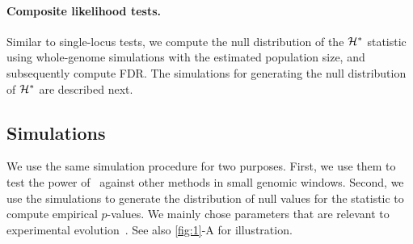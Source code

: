 \documentclass[9pt,twocolumn,twoside]{gsajnl}
\begin{document}
\paragraph{Composite likelihood tests.}

Similar to single-locus tests, we compute the null distribution of the
${\cal H}^*$ statistic using whole-genome simulations with the estimated
population size, and subsequently compute FDR. The simulations for
generating the null distribution of ${\cal H}^*$ are described next. 

\subsection{Simulations}\label{sec:sims}
We use the same simulation procedure for two purposes. First, we use
them to test the power of \comale\ against other methods in small
genomic windows. Second, we use the simulations to generate the
distribution of null values for the statistic to compute empirical
$p$-values. We mainly chose parameters that are relevant to \dmel
experimental evolution~\cite{kofler2013guide}. See also \ref{fig:1}-A
for illustration. 
\end{document}
